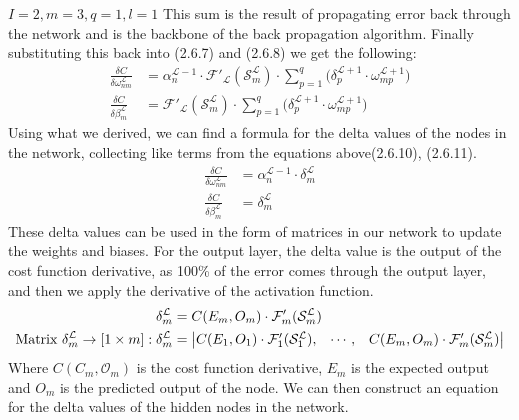\documentclass{report}
\begin{document}
\textit{$I=2, m=3, q=1, l=1$}
This sum is the result of propagating error back through the network and is the backbone of the back propagation algorithm.
Finally substituting this back into (2.6.7) and (2.6.8) we get the following:
\begin{align}
    \frac{\delta C}{\delta \omega^{\mathcal{L}}_{nm}} &= \alpha_{n}^{\mathcal{L}-1} \cdot \mathcal{F}'_{\mathcal{L}}(\mathcal{S}^{\mathcal{L}}_m) \cdot \sum_{p=1}^{q}\Big(\delta^{\mathcal{L}+1}_{p} \cdot \omega^{\mathcal{L}+1}_{mp}\Big)\\
    \frac{\delta C}{\delta \beta^{\mathcal{L}}_{m}} &= \mathcal{F}'_{\mathcal{L}}(\mathcal{S}^{\mathcal{L}}_m)\cdot\sum_{p=1}^{q}\Big(\delta^{\mathcal{L}+1}_{p} \cdot \omega^{\mathcal{L}+1}_{mp}\Big)
\end{align}
\vspace{1em}
\newline
Using what we derived, we can find a formula for the delta values of the nodes in the network, collecting like terms from the equations above(2.6.10), (2.6.11).
\begin{align}
    \frac{\delta C}{\delta \omega^{\mathcal{L}}_{nm}} &= \alpha_{n}^{\mathcal{L}-1} \cdot \delta^{\mathcal{L}}_{m}\\
    \frac{\delta C}{\delta \beta^{\mathcal{L}}_{m}} &= \delta^{\mathcal{L}}_{m}
\end{align}
\vspace{1em}
\newline
These delta values can be used in the form of matrices in our network to update the weights and biases.
For the output layer, the delta value is the output of the cost function derivative, as 100\% of the error comes through the output layer, and then we apply the derivative of the activation function.
\begin{align}
    \delta^{\mathcal{L}}_{m} &= C(E_{m},O_{m})\cdot\mathcal{F}'_{m}(\mathcal{S}^{\mathcal{L}}_{m}) \notag\\
    \text{Matrix }\delta^{\mathcal{L}}_{m} \rightarrow \left[1 \times m\right]:  \delta^{\mathcal{L}}_{m} &=
    \begin{vmatrix}
        C(E_{1},O_{1})\cdot\mathcal{F}'_{1}(\mathcal{S}^{\mathcal{L}}_{1}), & \cdots, & C(E_{m},O_{m})\cdot\mathcal{F}'_{m}(\mathcal{S}^{\mathcal{L}}_{m})
    \end{vmatrix} 
\end{align}
Where $C(C_{m},\mathcal{O}_{m})$ is the cost function derivative, $E_{m}$ is the expected output and $O_{m}$ is the predicted output of the node.
\vspace{1em}
\newline
We can then construct an equation for the delta values of the hidden nodes in the network.
\end{document}
